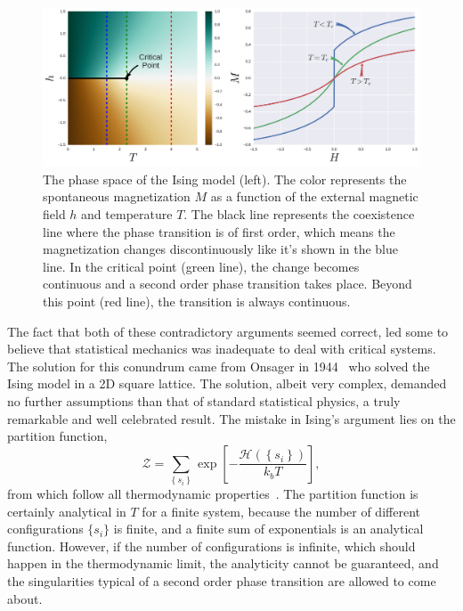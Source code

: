 \begin{figure}[t]
\begin{center}
    \includegraphics[width=\textwidth]{chapters/ch2-crit/figs/ising_phase2}
\end{center}
\caption{The phase space of the Ising model (left). The color represents the
    spontaneous magnetization $M$ as a function of the external magnetic field
    $h$ and temperature $T$. The black line represents the coexistence line
    where the phase transition is of first order, which means the magnetization
    changes discontinuously like it's shown in the blue line. In the critical
    point (green line), the change becomes continuous and a second order phase
    transition takes place. Beyond this point (red line), the transition is
    always continuous.}
\label{fig:ising_phase2}
\end{figure}

The fact that both of these contradictory arguments seemed correct, led some to
believe that statistical mechanics was inadequate to deal with critical
systems. The solution for this conundrum came from Onsager in
1944~\cite{Onsager1944} who solved the Ising model in a 2D square lattice. The
solution, albeit very complex, demanded no further assumptions than that of
standard statistical physics, a truly remarkable and well celebrated result.
The mistake in Ising's argument lies on the partition function,
\begin{equation}
    \mathcal{Z}=
    \sum_{\left\{ s_{i}\right\} }
    \exp\left[
        -\frac{\mathcal{H}\left(\left\{ s_{i}\right\} \right)}{k_{b}T}
    \right],
\end{equation}
from which follow all thermodynamic properties~\cite{Pathria1996}. The
partition function is certainly analytical in $T$ for a finite system, because
the number of different configurations $\{s_i\}$ is finite, and a finite sum of
exponentials is an analytical function. However, if the number of
configurations is infinite, which should happen in the thermodynamic limit, the
analyticity cannot be guaranteed, and the singularities typical of a second
order phase transition are allowed to come about.

